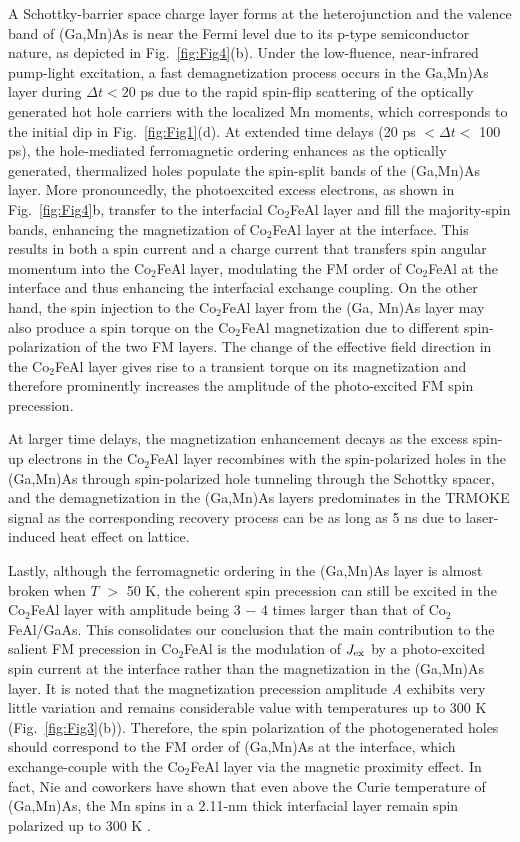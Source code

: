 \documentclass[%
 reprint,
superscriptaddress,
 amsmath,amssymb,
 aps,
prl,
]{revtex4-1}
\begin{document}
A Schottky-barrier space charge layer forms at the heterojunction and the valence band of (Ga,Mn)As is near the Fermi level due to its p-type semiconductor nature, as depicted in  Fig.~\ref{fig:Fig4}(b). Under the low-fluence, near-infrared pump-light excitation, a fast demagnetization process occurs in the Ga,Mn)As layer during $\Delta t<20$ ps due to the rapid spin-flip scattering of the optically generated hot hole carriers with the localized Mn moments, which corresponds to the initial dip in Fig.~\ref{fig:Fig1}(d).  At extended time delays (20 ps $<\Delta t<$ 100 ps), the hole-mediated ferromagnetic ordering enhances as the optically generated, thermalized holes populate the spin-split bands of the (Ga,Mn)As layer. More pronouncedly, the photoexcited excess electrons, as shown in Fig.~\ref{fig:Fig4}b, transfer to the interfacial Co$_2$FeAl layer and fill the majority-spin bands, enhancing the magnetization of Co$_2$FeAl layer at the interface. This results in both a spin current and a charge current that transfers spin angular momentum into the Co$_2$FeAl layer, modulating the FM order of Co$_2$FeAl at the interface and thus enhancing the interfacial exchange coupling. On the other hand, the spin injection to the Co$_2$FeAl layer from the (Ga, Mn)As layer may also produce a spin torque on the Co$_2$FeAl magnetization due to different spin-polarization of the two FM layers. The change of the effective field direction in the Co$_2$FeAl layer gives rise to a transient torque on its magnetization and therefore prominently increases the amplitude of the photo-excited FM spin precession. 

At larger time delays, the magnetization enhancement decays as the excess spin-up electrons in the Co$_2$FeAl layer recombines with the spin-polarized holes in the (Ga,Mn)As through spin-polarized hole tunneling through the Schottky spacer, and the demagnetization in the (Ga,Mn)As layers predominates in the TRMOKE signal as the corresponding recovery process can be as long as 5 ns due to laser-induced heat effect on lattice. \cite{29}

Lastly, although the ferromagnetic ordering in the (Ga,Mn)As layer is almost broken when $T$ $>$ 50 K, the coherent spin precession can still be excited in the Co$_2$FeAl layer with amplitude being 3 $-$ 4 times larger than that of Co$_2$FeAl/GaAs. This consolidates our conclusion that the main contribution to the salient FM precession in Co$_2$FeAl is the modulation of $J_\textup{ex}$ by a photo-excited spin current at the interface rather than the magnetization in the (Ga,Mn)As layer. It is noted that the magnetization precession amplitude \textit{A} exhibits very little variation and remains considerable value with temperatures up to 300 K (Fig.~\ref{fig:Fig3}(b)). Therefore, the spin polarization of the photogenerated holes should correspond to the FM order of (Ga,Mn)As at the interface, which exchange-couple with the Co$_2$FeAl layer via the magnetic proximity effect. In fact, Nie and coworkers have shown that even above the Curie temperature of (Ga,Mn)As, the Mn spins in a 2.11-nm thick interfacial layer remain spin polarized up to 300 K \cite{24}. 
\end{document}
